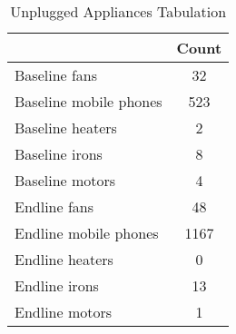 \begin{table}[htbp]\centering
\def\sym#1{\ifmmode^{#1}\else\(^{#1}\)\fi}
\caption{Unplugged Appliances Tabulation\label {tab1}}
\begin{tabular}{l*{1}{c}}
\toprule
                    &       Count\\
\midrule
Baseline fans       &          32\\
Baseline mobile phones&         523\\
Baseline heaters    &           2\\
Baseline irons      &           8\\
Baseline motors     &           4\\
Endline fans        &          48\\
Endline mobile phones&        1167\\
Endline heaters     &           0\\
Endline irons       &          13\\
Endline motors      &           1\\
\bottomrule
\end{tabular}
\end{table}
